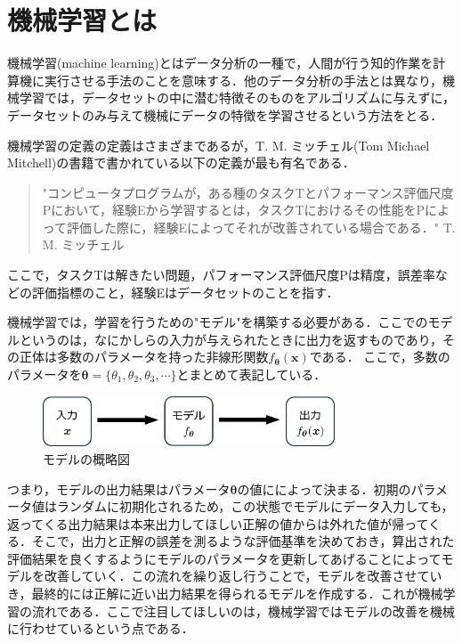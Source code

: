 \documentclass[a4paper,11pt]{jsreport}
\begin{document}
\section{機械学習とは}
機械学習(machine learning)とはデータ分析の一種で，人間が行う知的作業を計算機に実行させる手法のことを意味する．他のデータ分析の手法とは異なり，機械学習では，データセットの中に潜む特徴そのものをアルゴリズムに与えずに，データセットのみ与えて機械にデータの特徴を学習させるという方法をとる．\par
機械学習の定義の定義はさまざまであるが，T. M. ミッチェル(Tom Michael Mitchell)の書籍\cite{Tom1997Machine}で書かれている以下の定義が最も有名である．
\begin{quote}
  "コンピュータプログラムが，ある種のタスクTとパフォーマンス評価尺度Pにおいて，経験Eから学習するとは，タスクTにおけるその性能をPによって評価した際に，経験Eによってそれが改善されている場合である．"
  \hfill T. M. ミッチェル
\end{quote}
ここで，タスクTは解きたい問題，パフォーマンス評価尺度Pは精度，誤差率などの評価指標のこと，経験Eはデータセットのことを指す．\par
機械学習では，学習を行うための"モデル"を構築する必要がある．ここでのモデルというのは，なにかしらの入力が与えられたときに出力を返すものであり，その正体は多数のパラメータを持った非線形関数$f_{\bm{\theta}}(\bm{x})$である． ここで，多数のパラメータを$\bm{\theta} = \{ \theta_1, \theta_2, \theta_3, \cdots \}$とまとめて表記している．
\begin{figure}[H]
  \begin{center}
    \includegraphics[height=1.5cm]{image/モデル概要図.png}
    \caption{モデルの概略図}
  \end{center}
\end{figure}
つまり，モデルの出力結果はパラメータ$\bm{\theta}$の値にによって決まる．初期のパラメータ値はランダムに初期化されるため，この状態でモデルにデータ入力しても，返ってくる出力結果は本来出力してほしい正解の値からは外れた値が帰ってくる．そこで，出力と正解の誤差を測るような評価基準を決めておき，算出された評価結果を良くするようにモデルのパラメータを更新してあげることによってモデルを改善していく．この流れを繰り返し行うことで，モデルを改善させていき，最終的には正解に近い出力結果を得られるモデルを作成する．これが機械学習の流れである．ここで注目してほしいのは，機械学習ではモデルの改善を機械に行わせているという点である．\par
\end{document}
